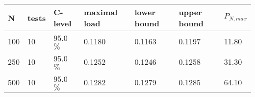 
\begin{tabular}{|l|l|l|l|l|l|l|} 
\hline 
N & tests & C-level & maximal load & lower bound & upper bound & $P_{N,max}$\\ 
 \hline \hline 
100 & 10 & 95.0 $ \% $& 0.1180 & 0.1163 & 0.1197 & 11.80 \\ 
250 & 10 & 95.0 $ \% $& 0.1252 & 0.1246 & 0.1258 & 31.30 \\ 
500 & 10 & 95.0 $ \% $& 0.1282 & 0.1279 & 0.1285 & 64.10 \\ 
\hline 
\end{tabular} 
